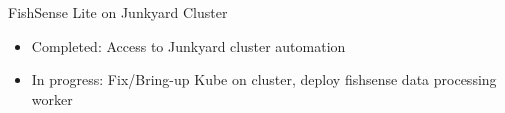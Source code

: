





\begin{frame}{FishSense Lite on Junkyard Cluster}
    \begin{itemize}
        \item Completed: Access to Junkyard cluster automation
        \item In progress: Fix/Bring-up Kube on cluster, deploy fishsense data processing worker
    \end{itemize}    
\end{frame}
